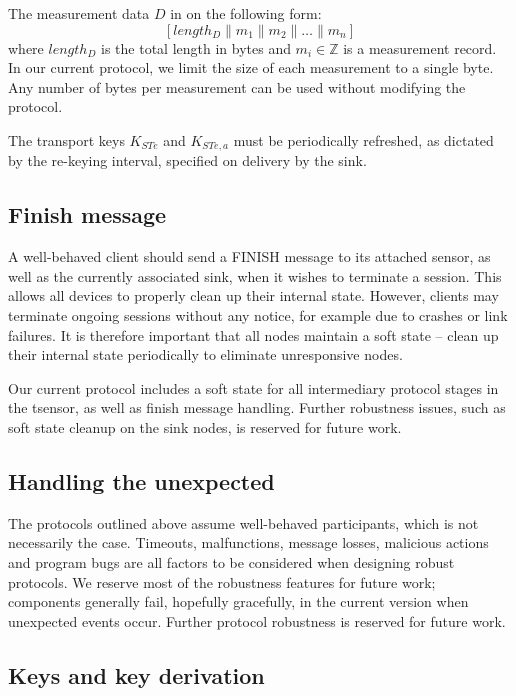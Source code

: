 The measurement data $D$ in on the following form:
%
\[
[ length_D \parallel m_1 \parallel m_2 \parallel \dots \parallel m_n ]
\]
%
where $length_D$ is the total length in bytes and $m_i \in \mathbb{Z}$ is a measurement
record. %
In our current protocol, we limit the size of each measurement to a single byte. Any number of bytes per measurement can be used without modifying the protocol.

The transport keys $K_{STe}$ and $K_{STe,a}$ must be periodically refreshed, as dictated by the re-keying interval, specified on delivery by the sink.

\subsection{Finish message}

A well-behaved client should send a FINISH message to its attached sensor, as well as the currently associated sink, when it wishes to
terminate a session. This allows all devices to properly clean up their internal state. However, clients may terminate ongoing sessions without any notice, for example due to crashes or link failures. It is therefore important that all nodes maintain a soft state -- clean up their internal state periodically to eliminate unresponsive nodes. 

Our current protocol includes a soft state for all intermediary protocol stages in the tsensor, as well as finish message handling. Further robustness issues, such as soft state cleanup on the sink nodes, is reserved for future work.

\subsection{Handling the unexpected}

The protocols outlined above assume well-behaved participants, which is
not necessarily the case. Timeouts, malfunctions, message losses,
malicious actions and program bugs are all factors to be considered
when designing robust protocols. We reserve most of the robustness
features for future work; components generally fail, hopefully
gracefully, in the current version when unexpected events
occur. Further protocol robustness is reserved for future work.

\subsection{Keys and key derivation}
\label{sec:key-derivation}

